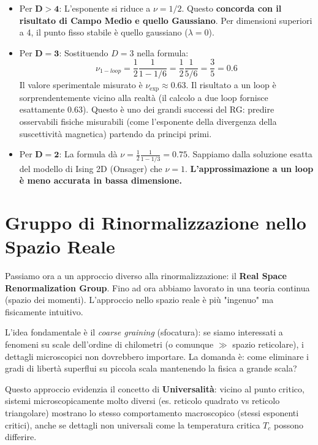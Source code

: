 \begin{itemize}
    \item Per $\mathbf{D > 4}$: L'esponente si riduce a $\nu = 1/2$. Questo \textbf{concorda con il risultato di Campo Medio e quello Gaussiano}. Per dimensioni superiori a 4, il punto fisso stabile è quello gaussiano ($\lambda=0$).
    \item Per $\mathbf{D = 3}$: Sostituendo $D=3$ nella formula:
    \begin{equation}
    \nu_{1-loop} = \frac{1}{2} \frac{1}{1 - 1/6} = \frac{1}{2} \frac{1}{5/6} = \frac{3}{5} = 0.6
    \end{equation}
    Il valore sperimentale misurato è $\nu_{\text{exp}} \approx 0.63$. Il risultato a un loop è sorprendentemente vicino alla realtà (il calcolo a due loop fornisce esattamente 0.63). Questo è uno dei grandi successi del RG: predire osservabili fisiche misurabili (come l'esponente della divergenza della suscettività magnetica) partendo da principi primi.
    \item Per $\mathbf{D = 2}$: La formula dà $\nu = \frac{1}{2} \frac{1}{1 - 1/3} = 0.75$. Sappiamo dalla soluzione esatta del modello di Ising 2D (Onsager) che $\nu = 1$. \textbf{L'approssimazione a un loop è meno accurata in bassa dimensione.}
\end{itemize}

\section{Gruppo di Rinormalizzazione nello Spazio Reale}

Passiamo ora a un approccio diverso alla rinormalizzazione: il \textbf{Real Space Renormalization Group}.
Fino ad ora abbiamo lavorato in una teoria continua (spazio dei momenti). L'approccio nello spazio reale è più "ingenuo" ma fisicamente intuitivo.

L'idea fondamentale è il \textit{coarse graining} (sfocatura): se siamo interessati a fenomeni su scale dell'ordine di chilometri (o comunque $\gg$ spazio reticolare), i dettagli microscopici non dovrebbero importare.
La domanda è: come eliminare i gradi di libertà superflui su piccola scala mantenendo la fisica a grande scala?

\noindent Questo approccio evidenzia il concetto di \textbf{Universalità}: vicino al punto critico, sistemi microscopicamente molto diversi (es. reticolo quadrato vs reticolo triangolare) mostrano lo stesso comportamento macroscopico (stessi esponenti critici), anche se dettagli non universali come la temperatura critica $T_c$ possono differire.

